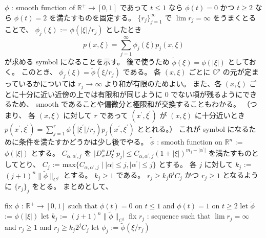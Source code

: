 \begin{Proof}
\itemprof
  \(\phi\) : smooth function of \(\mathbb{R}^{+} \to [0,1]\) であって \(t \leq 1\) なら \(\phi(t) = 0\) かつ \(t \geq 2\) なら \(\phi(t) = 2\) を満たすものを固定する。
  \(\{r_j\}_{j=1}^\infty\) で \(\lim r_j = \infty\) をうまくとることで、
  \(\phi_j(\xi)\) := \(\phi(\lvert \xi \rvert / r_j)\) としたとき
  \[p(x,\xi) = \sum_{j=1}^\infty \phi_j(\xi) p_j(x,\xi)\]
  が求める symbol になることを示す。
  後で使うため \(\tilde{\phi}(\xi) = \phi(\lvert \xi \rvert)\) としておく。
  このとき、 \(\phi_j(\xi) = \tilde{\phi}(\xi / r_j)\) である。
  各 \((x,\xi)\) ごとに \(\mathbb{C}^p\) の元が定まっているかについては \(r_j \to \infty\) より和が有限のためよい。
  また、各 \((x,\xi)\) ごとに十分に近い近傍の上では有限和が同じように \(0\) でない項が残るようにできるため、 smooth であることや偏微分と極限和が交換することもわかる。
  （つまり、 各 \((x,\xi)\) に対して \(r\) であって \((x^{\prime} , \xi^{\prime})\) が \((x,\xi)\) に十分近いとき \(p(x^{\prime},\xi^{\prime}) = \sum_{j=1}^r \phi(\lvert \xi^{\prime} \rvert / r_j) p_j(x^{\prime},\xi^{\prime})\) ととれる。）
  これが symbol になるために条件を満たすかどうかは少し後でやる。
  \(\tilde{\phi}\) : smooth function on \(\mathbb{R}^n\) := \(\phi(\lvert \xi \rvert)\) とする。
  \(C_{\alpha , \alpha^{\prime} , j}\) を \(\lvert D^\alpha_x D^{\alpha^\prime}_\xi p_j \rvert \leq C_{\alpha , \alpha^{\prime} , j} (1 + \lvert \xi \rvert)^{m_j - \lvert \alpha^\prime \rvert}\) を満たすものとしてとり、 \(C_j\) := \(\text{max} \{C_{\alpha , \alpha^\prime , j} \mid \lvert \alpha \rvert \leq j , \lvert \alpha^\prime \rvert \leq j\}\) とする。
  各 \(j\) に対して \(k_j\) := \((j + 1)^{n} \lVert \tilde{\phi} \rVert_{C^j}\) とする。
  \(k_j \geq 1\) である。
  \(r_j \geq k_j 6^j C_j\) かつ \(r_j \geq 1\) となるように \(\{r_j\}_j\) をとる。
  まとめとして、
  \begin{itemize}
    \itemenum fix \(\phi\) : \(\mathbb{R}^+ \to [0,1]\) such that \(\phi(t) = 0\) on \(t \leq 1\) and \(\phi(t) = 1\) on \(t \geq 2\)
    \itemenum let \(\tilde{\phi}\) := \(\phi(\lvert \xi \rvert)\)
    \itemenum let \(k_j\) := \((j + 1)^{n} \lVert \tilde{\phi} \rVert_{C^j}\)
    \itemenum fix \(r_j\) : sequence such that \(\lim r_j = \infty\) and \(r_j \geq 1\) and \(r_j \geq k_j 2^j C_j\)
    \itemenum let \(\phi_j\) := \(\tilde{\phi}(\xi / r_j)\)
  \end{itemize}
\end{Proof}

